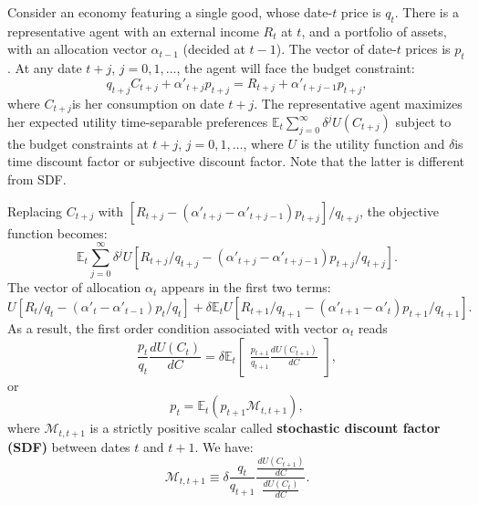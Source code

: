 \documentclass[
  12pt,
]{book}
\theoremstyle{definition}
\theoremstyle{definition}
\theoremstyle{definition}
\theoremstyle{definition}
\theoremstyle{remark}
\begin{document}
Consider an economy featuring a single good, whose date-\(t\) price is \(q_t\). There is a representative agent with an external income \(R_t\) at \(t\), and a portfolio of assets, with an allocation vector \(\alpha_{t-1}\) (decided at \(t-1\)). The vector of date-\(t\) prices is \(p_t\). At any date \(t+j\), \(j=0,1,...\), the agent will face the budget constraint:
\[
q_{t+j}C_{t+j}+\alpha'_{t+j}p_{t+j} = R_{t+j} +
\alpha'_{t+j-1}p_{t+j},
\]
where \(C_{t+j}\)is her consumption on date \(t+j\). The representative agent maximizes her expected utility time-separable preferences \(\mathbb{E}_t \sum^\infty_{j=0} \delta^j U(C_{t+j})\) subject to the budget constraints at \(t+j\), \(j= 0,1,\dots\), where \(U\) is the utility function and \(\delta\)is time discount factor or subjective discount factor. Note that the latter is different from SDF.

Replacing \(C_{t+j}\) with \([R_{t+j}-(\alpha'_{t+j}-\alpha'_{t+j-1})p_{t+j}]/q_{t+j}\), the objective function becomes:
\[
\mathbb{E}_t  \sum^\infty_{j=0} \delta^j U
[R_{t+j}/q_{t+j}-(\alpha'_{t+j}-\alpha'_{t+j-1})p_{t+j}/q_{t+j}].
\]
The vector of allocation \(\alpha_t\) appears in the first two terms:
\[
U[R_t/q_t-(\alpha'_t-\alpha'_{t-1})p_t/q_t] + \delta \mathbb{E}_t
U[R_{t+1}/q_{t+1}-(\alpha'_{t+1}-\alpha'_t)p_{t+1}/q_{t+1}].
\]
As a result, the first order condition associated with vector \(\alpha_t\) reads
\[
\frac{p_t}{q_t}  \frac{d U(C_t)}{dC} = \delta \mathbb{E}_t \left[
\begin{array}{l}
\frac{p_{t+1}}{q_{t+1}}  \frac{dU(C_{t+1})}{dC}
\end{array}
\right],
\]
or
\begin{equation}
p_t = \mathbb{E}_t(p_{t+1} \mathcal{M}_{t,t+1}),\label{eq:SDF100}
\end{equation}
where \(\mathcal{M}_{t,t+1}\) is a strictly positive scalar called \textbf{stochastic discount factor (SDF)} between dates \(t\) and \(t+1\). We have:
\[
\mathcal{M}_{t,t+1} \equiv \delta  \frac{q_t}{q_{t+1}} 
\frac{  \frac{dU(C_{t+1})}{dC}} {
\frac{dU(C_t)}{dC}}.
\]
\end{document}
